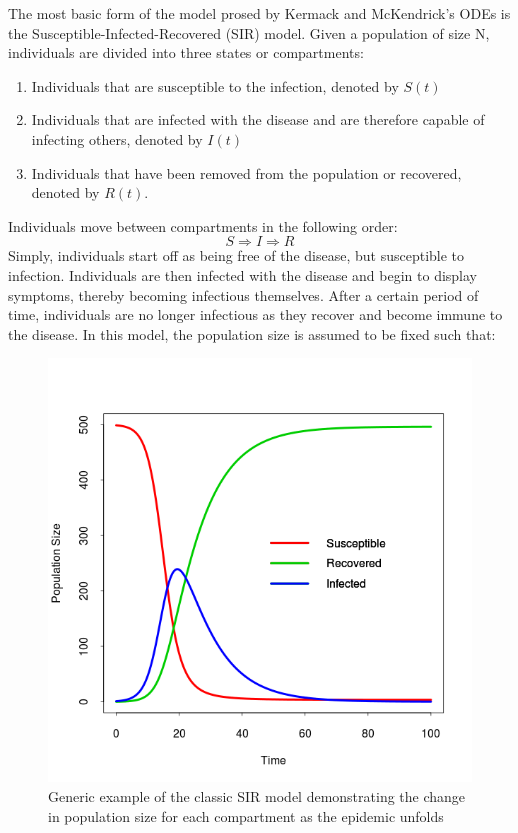 \documentclass[11pt, a4paper, oneside,titlepage]{article}
\begin{document}
The most basic form of the model prosed by Kermack and McKendrick's ODEs is the Susceptible-Infected-Recovered (SIR) model. Given a population of size N, individuals are divided into three states or compartments: 

\begin{enumerate}
	\item Individuals that are susceptible to the infection, denoted by $S(t)$
	\item Individuals that are infected with the disease and are therefore capable of infecting others, denoted by $I(t)$
	\item Individuals that have been removed from the population or recovered, denoted by $R(t)$. 
\end{enumerate}

Individuals move between compartments in the following order:
\begin{equation*}
S \Longrightarrow I \Longrightarrow R
\end{equation*}
Simply, individuals start off as being free of the disease, but susceptible to infection. Individuals are then infected with the disease and begin to display symptoms, thereby becoming infectious themselves. After a certain period of time, individuals are no longer infectious as they recover and become immune to the disease. In this model, the population size is assumed to be fixed such that:

\begin{figure}[ht!]
\centering
\includegraphics[width=120mm]{Rplot.png}
\caption{Generic example of the classic SIR model demonstrating the change in population size for each compartment as the epidemic unfolds}
\label{sir}
\end{figure}
\end{document}
